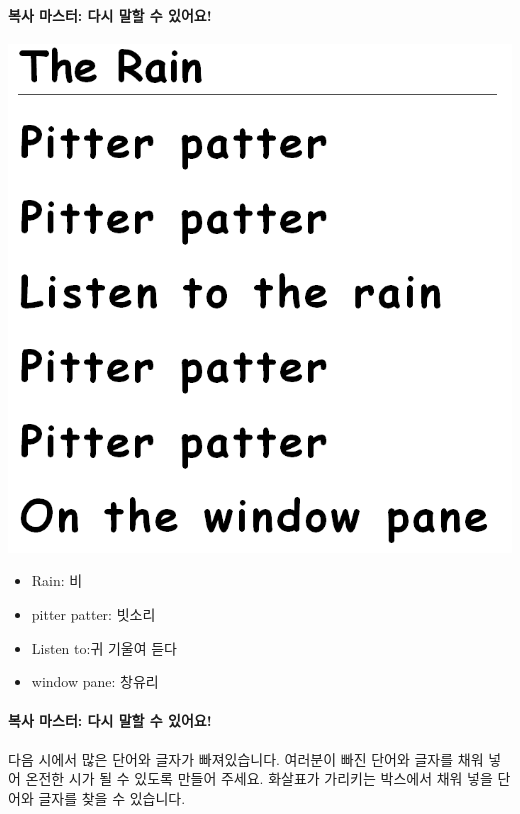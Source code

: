 \documentclass[]{article}
\begin{document}
\mbox{}\paragraph{복사 마스터: 다시 말할 수 있어요!}\label{section-50}

\includegraphics{csunplugged/01-part/img/ch03-text/03-text-02-the-rain.png}

\begin{itemize}
\itemsep1pt\parskip0pt
\item
  Rain: 비
\item
  pitter patter: 빗소리
\item
  Listen to:귀 기울여 듣다
\item
  window pane: 창유리
\end{itemize}

\mbox{}\paragraph{복사 마스터: 다시 말할 수 있어요!}\label{section-51}

다음 시에서 많은 단어와 글자가 빠져있습니다. 여러분이 빠진 단어와 글자를
채워 넣어 온전한 시가 될 수 있도록 만들어 주세요. 화살표가 가리키는
박스에서 채워 넣을 단어와 글자를 찾을 수 있습니다.
\end{document}
